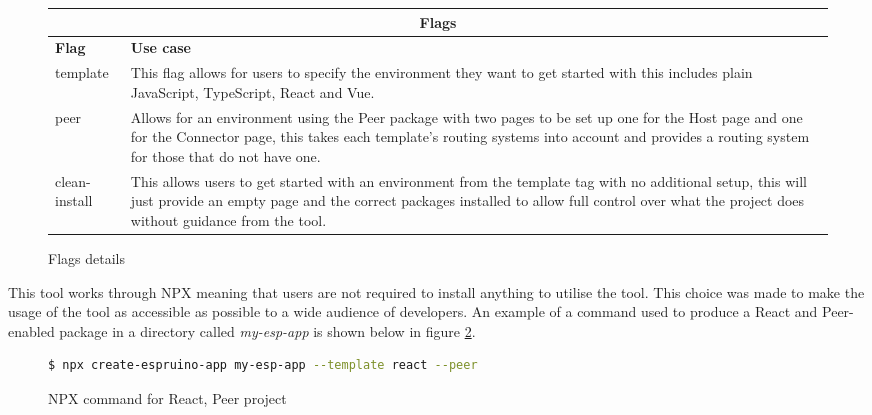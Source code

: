\documentclass{l4proj}
\begin{document}
\begin{figure}[!ht]
    \centering
    \begin{tabular}{|p{2.25cm}|p{10cm}|}
 \hline
 \multicolumn{2}{|c|}{Flags} \\
 \hline
 \textbf{Flag}  & \textbf{Use case}\\
 \hline
 template & This flag allows for users to specify the environment they want to get started with this includes plain JavaScript, TypeScript, React and Vue.\\ \hline

 peer & Allows for an environment using the Peer package with two pages to be set up one for the Host page and one for the Connector page, this takes each template's routing systems into account and provides a routing system for those that do not have one.\\ \hline

 clean-install & This allows users to get started with an environment from the template tag with no additional setup, this will just provide an empty page and the correct packages installed to allow full control over what the project does without guidance from the tool.\\
 \hline
    \end{tabular}
    \caption{Flags details}
    \label{fig:flag-comp}
\end{figure}

This tool works through NPX meaning that users are not required to install anything to utilise the tool. This choice was made to make the usage of the tool as accessible as possible to a wide audience of developers. An example of a command used to produce a React and Peer-enabled package in a directory called \textit{my-esp-app} is shown below in figure \ref{fig:npx-command}.

\begin{figure}[!ht]
    \centering
    \begin{lstlisting}[language=bash]
        $ npx create-espruino-app my-esp-app --template react --peer
    \end{lstlisting}
    \caption{NPX command for React, Peer project}
    \label{fig:npx-command}
\end{figure}
\end{document}
